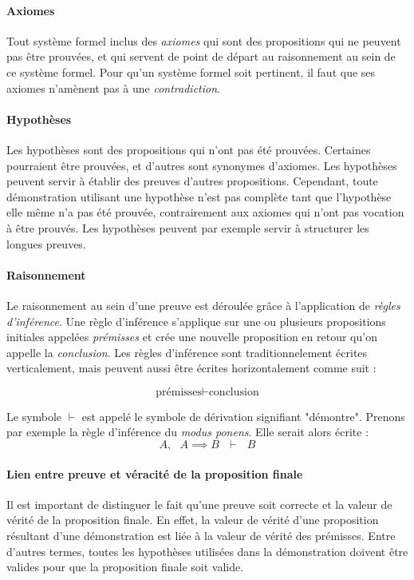 			\paragraph{Axiomes} Tout système formel inclus des \emph{axiomes} qui sont des propositions qui ne peuvent pas être prouvées, et qui servent de point de départ au raisonnement au sein de ce système formel. Pour qu'un système formel soit pertinent, il faut que ses axiomes n'amènent pas à une \emph{contradiction}.

			\paragraph{Hypothèses} Les hypothèses sont des propositions qui n'ont pas été prouvées. Certaines pourraient être prouvées, et d'autres sont synonymes d'axiomes. Les hypothèses peuvent servir à établir des preuves d'autres propositions. Cependant, toute démonstration utilisant une hypothèse n'est pas complète tant que l'hypothèse elle même n'a pas été prouvée, contrairement aux axiomes qui n'ont pas vocation à être prouvés. Les hypothèses peuvent par exemple servir à structurer les longues preuves.

			\paragraph{Raisonnement}
			Le raisonnement au sein d'une preuve est déroulée grâce à l'application de \emph{règles d'inférence}. Une règle d'inférence s'applique sur une ou plusieurs propositions initiales appelées \emph{prémisses} et crée une nouvelle proposition en retour qu'on appelle la \emph{conclusion}.
			Les règles d'inférence sont traditionnelement écrites verticalement, mais peuvent aussi être écrites horizontalement comme suit :

			$$ \text{prémisses} \vdash \text{conclusion}$$

			Le symbole $\vdash$ est appelé le symbole de dérivation signifiant "démontre". Prenons par exemple la règle d'inférence du \emph{modus ponens}. Elle serait alors écrite :
			$$ A,~~~A \implies B~~~\vdash~~~B $$

			\paragraph{Lien entre preuve et véracité de la proposition finale} Il est important de distinguer le fait qu'une preuve soit correcte et la valeur de vérité de la proposition finale. En effet, la valeur de vérité d'une proposition résultant d'une démonstration est liée à la valeur de vérité des prémisses. Entre d'autres termes, toutes les hypothèses utilisées dans la démonstration doivent être valides pour que la proposition finale soit valide.

